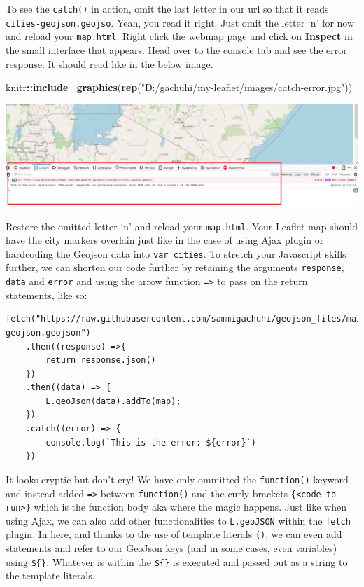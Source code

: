 \documentclass[
]{book}
\newenvironment{Shaded}{\begin{snugshade}}{\end{snugshade}}
\newcommand{\FunctionTok}[1]{\textcolor[rgb]{0.13,0.29,0.53}{\textbf{#1}}}
\newcommand{\NormalTok}[1]{#1}
\newcommand{\SpecialCharTok}[1]{\textcolor[rgb]{0.81,0.36,0.00}{\textbf{#1}}}
\newcommand{\StringTok}[1]{\textcolor[rgb]{0.31,0.60,0.02}{#1}}
\begin{document}
To see the \texttt{catch()} in action, omit the last letter in our url so that it reads \texttt{cities-geojson.geojso}. Yeah, you read it right. Just omit the letter `n' for now and reload your \texttt{map.html}. Right click the webmap page and click on \textbf{Inspect} in the small interface that appears. Head over to the console tab and see the error response. It should read like in the below image.

\begin{Shaded}
\begin{Highlighting}[]
\NormalTok{knitr}\SpecialCharTok{::}\FunctionTok{include\_graphics}\NormalTok{(}\FunctionTok{rep}\NormalTok{(}\StringTok{"D:/gachuhi/my{-}leaflet/images/catch{-}error.jpg"}\NormalTok{))}
\end{Highlighting}
\end{Shaded}

\includegraphics{../images/catch-error.jpg}

Restore the omitted letter `n' and reload your \texttt{map.html}. Your Leaflet map should have the city markers overlain just like in the case of using Ajax plugin or hardcoding the Geojson data into \texttt{var\ cities}. To stretch your Javascript skills further, we can shorten our code further by retaining the arguments \texttt{response}, \texttt{data} and \texttt{error} and using the arrow function \texttt{=\textgreater{}} to pass on the return statements, like so:

\begin{verbatim}
fetch("https://raw.githubusercontent.com/sammigachuhi/geojson_files/main/cities-geojson.geojson")
    .then((response) =>{
        return response.json()
    })
    .then((data) => {
        L.geoJson(data).addTo(map);
    })
    .catch((error) => {
        console.log(`This is the error: ${error}`)
    })
\end{verbatim}

It looks cryptic but don't cry! We have only ommitted the \texttt{function()} keyword and instead added \texttt{=\textgreater{}} between \texttt{function()} and the curly brackets \texttt{\{\textless{}code-to-run\textgreater{}\}} which is the function body aka where the magic happens. Just like when using Ajax, we can also add other functionalities to \texttt{L.geoJSON} within the \texttt{fetch} plugin. In here, and thanks to the use of template literals \texttt{(\textasciigrave{}\textasciigrave{})}, we can even add statements and refer to our GeoJson keys (and in some cases, even variables) using \texttt{\$\{\}}. Whatever is within the \texttt{\$\{\}} is executed and passed out as a string to the template literals.
\end{document}
